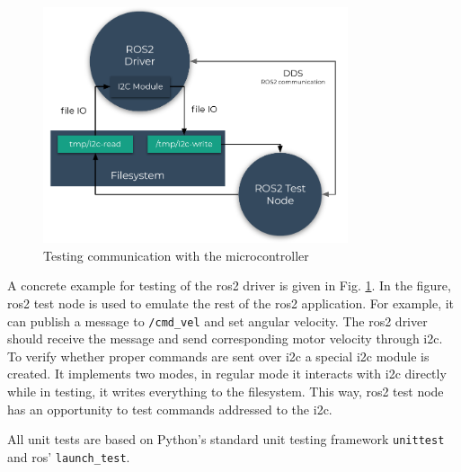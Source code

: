 \begin{figure}[H]
    \centering
    \includegraphics[width=0.8\textwidth]{physical/figures/mocking.pdf}
    \caption{Testing communication with the microcontroller}
    \label{fig:physical:mocking}
\end{figure}

A concrete example for testing of the \ac{ros2} driver is given in Fig. \ref{fig:physical:mocking}. In the figure, \ac{ros2} test node is used to emulate the rest of the \ac{ros2} application. For example, it can publish a message to \texttt{/cmd\_vel} and set angular velocity.
The \ac{ros2} driver should receive the message and send corresponding motor velocity through \ac{i2c}. To verify whether proper commands are sent over \ac{i2c} a special \ac{i2c} module is created.
It implements two modes, in regular mode it interacts with \ac{i2c} directly while in testing, it writes everything to the filesystem. 
This way, \ac{ros2} test node has an opportunity to test commands addressed to the \ac{i2c}.

All unit tests are based on Python's standard unit testing framework \texttt{unittest} and \ac{ros}' \texttt{launch\_test}.

